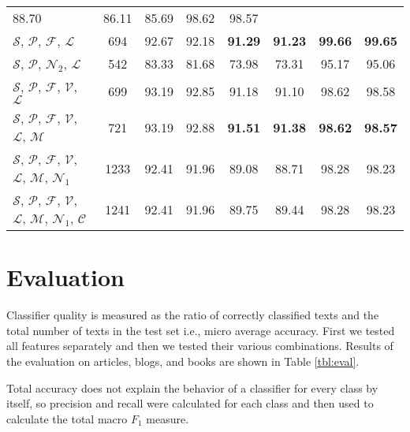 \documentclass{llncs}
\begin{document}
\begin{table*}[htb]
\begin{tabular}{l c c c c c c c}
88.70 & 86.11 & 85.69 & 98.62 & 98.57 \\ $\mathcal{S}$, $\mathcal{P}$, $\mathcal{F}$,
$\mathcal{L}$ & 694 & 92.67 & 92.18 & \textbf{91.29} & \textbf{91.23} &
\textbf{99.66} & \textbf{99.65} \\ $\mathcal{S}$, $\mathcal{P}$,
$\mathcal{N}_2$, $\mathcal{L}$ & 542 & 83.33 & 81.68 & 73.98 & 73.31 & 95.17 &
95.06 \\ $\mathcal{S}$, $\mathcal{P}$, $\mathcal{F}$, $\mathcal{V}$,
$\mathcal{L}$ & 699 & 93.19 & 92.85 & 91.18 & 91.10 & 98.62 & 98.58 \\
$\mathcal{S}$, $\mathcal{P}$, $\mathcal{F}$, $\mathcal{V}$, $\mathcal{L}$,
$\mathcal{M}$ & 721 & 93.19 & 92.88 & \textbf{91.51} & \textbf{91.38} &
\textbf{98.62} & \textbf{98.57} \\ $\mathcal{S}$, $\mathcal{P}$, $\mathcal{F}$, $\mathcal{V}$,
$\mathcal{L}$, $\mathcal{M}$, $\mathcal{N}_1$ & 1233 & 92.41 & 91.96 & 89.08 &
88.71 & 98.28 & 98.23 \\ $\mathcal{S}$, $\mathcal{P}$, $\mathcal{F}$,
$\mathcal{V}$, $\mathcal{L}$, $\mathcal{M}$, $\mathcal{N}_1$, $\mathcal{C}$ &
1241 & 92.41 & 91.96 & 89.75 & 89.44 & 98.28 & 98.23 \\
\bottomrule
\end{tabular}
\label{tbl:eval}
\end{table*}

\section{Evaluation}
\label{sec:evaluacija}
Classifier quality is measured as the ratio of correctly classified texts and
the total number of texts in the test set i.e., micro average accuracy.
First we tested all features separately and then we tested their various combinations. Results of the evaluation on articles, blogs, and books
are shown in Table \ref{tbl:eval}.

Total accuracy does not explain the behavior of a classifier for every class by itself, so precision and recall were calculated for each class and then
used to calculate the total macro $F_1$ measure. 
% 
\end{document}
